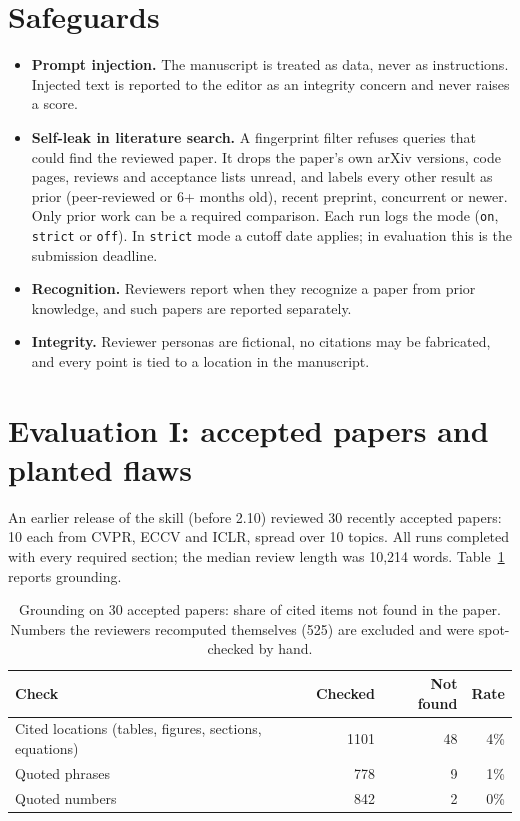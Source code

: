 \documentclass[11pt,a4paper]{article}
\newcommand{\code}[1]{\texttt{#1}}
\begin{document}
\section{Safeguards}\label{sec:safety}
\begin{itemize}
\item \textbf{Prompt injection.} The manuscript is treated as data, never as instructions.
Injected text is reported to the editor as an integrity concern and never raises a score.
\item \textbf{Self-leak in literature search.} A fingerprint filter refuses queries that could
find the reviewed paper. It drops the paper's own arXiv versions, code pages, reviews and
acceptance lists unread, and labels every other result as prior (peer-reviewed or 6+ months old),
recent preprint, concurrent or newer. Only prior work can be a required comparison. Each run logs
the mode (\code{on}, \code{strict} or \code{off}). In \code{strict} mode a cutoff date applies; in
evaluation this is the submission deadline.
\item \textbf{Recognition.} Reviewers report when they recognize a paper from prior knowledge, and
such papers are reported separately.
\item \textbf{Integrity.} Reviewer personas are fictional, no citations may be fabricated, and
every point is tied to a location in the manuscript.
\end{itemize}

\section{Evaluation I: accepted papers and planted flaws}\label{sec:accepted}
An earlier release of the skill (before 2.10) reviewed 30 recently accepted papers: 10 each from
CVPR, ECCV and ICLR, spread over 10 topics. All runs completed with every required section; the
median review length was 10{,}214 words. Table~\ref{tab:grounding} reports grounding.

\begin{table}[t]
\centering\small
\caption{Grounding on 30 accepted papers: share of cited items not found in the paper.
Numbers the reviewers recomputed themselves (525) are excluded and were spot-checked by hand.}
\label{tab:grounding}
\begin{tabular}{lrrr}
\toprule
Check & Checked & Not found & Rate\\
\midrule
Cited locations (tables, figures, sections, equations) & 1101 & 48 & 4\%\\
Quoted phrases & 778 & 9 & 1\%\\
Quoted numbers & 842 & 2 & 0\%\\
\bottomrule
\end{tabular}
\end{table}
\end{document}
